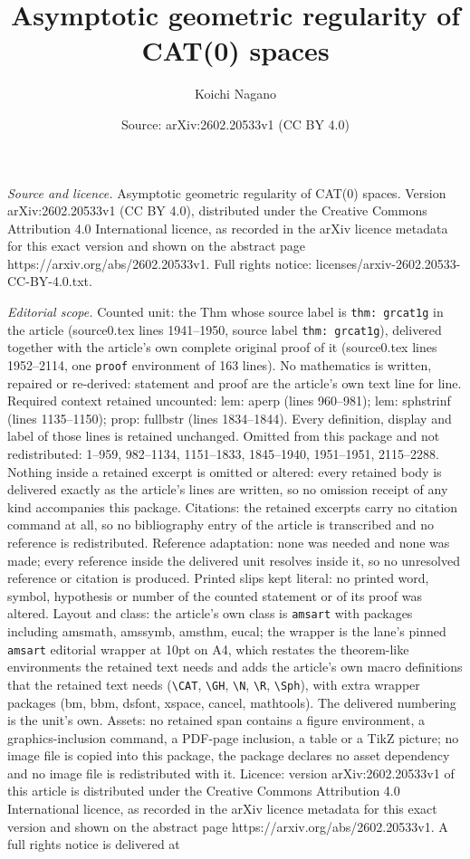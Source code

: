 \documentclass[10pt,a4paper]{amsart}
\title[Asymptotic geometric regularity of CAT(0) spaces]{Asymptotic geometric regularity of CAT(0) spaces}
\author{Koichi Nagano}
\date{Source: arXiv:2602.20533v1 (CC BY 4.0)}
\begin{document}
\maketitle

\noindent\emph{Source and licence.} Asymptotic geometric regularity of CAT(0) spaces. Version arXiv:2602.20533v1 (CC BY 4.0), distributed under the Creative Commons Attribution 4.0 International licence, as recorded in the arXiv licence metadata for this exact version and shown on the abstract page https://arxiv.org/abs/2602.20533v1. Full rights notice: licenses/arxiv-2602.20533-CC-BY-4.0.txt.\par\smallskip

\noindent\textit{Editorial scope.} Counted unit: the Thm whose source label is \texttt{thm: grcat1g} in the article (source0.tex lines 1941--1950, source label \texttt{thm: grcat1g}), delivered together with the article's own complete original proof of it (source0.tex lines 1952--2114, one \texttt{proof} environment of 163 lines). No mathematics is written, repaired or re-derived: statement and proof are the article's own text line for line. Required context retained uncounted: lem: aperp (lines 960--981); lem: sphstrinf (lines 1135--1150); prop: fullbstr (lines 1834--1844). Every definition, display and label of those lines is retained unchanged. Omitted from this package and not redistributed: 1--959, 982--1134, 1151--1833, 1845--1940, 1951--1951, 2115--2288. Nothing inside a retained excerpt is omitted or altered: every retained body is delivered exactly as the article's lines are written, so no omission receipt of any kind accompanies this package. Citations: the retained excerpts carry no citation command at all, so no bibliography entry of the article is transcribed and no reference is redistributed. Reference adaptation: none was needed and none was made; every reference inside the delivered unit resolves inside it, so no unresolved reference or citation is produced. Printed slips kept literal: no printed word, symbol, hypothesis or number of the counted statement or of its proof was altered. Layout and class: the article's own class is \texttt{amsart} with packages including amsmath, amssymb, amsthm, eucal; the wrapper is the lane's pinned \texttt{amsart} editorial wrapper at 10pt on A4, which restates the theorem-like environments the retained text needs and adds the article's own macro definitions that the retained text needs (\texttt{\textbackslash CAT}, \texttt{\textbackslash GH}, \texttt{\textbackslash N}, \texttt{\textbackslash R}, \texttt{\textbackslash Sph}), with extra wrapper packages (bm, bbm, dsfont, xspace, cancel, mathtools). The delivered numbering is the unit's own. Assets: no retained span contains a figure environment, a graphics-inclusion command, a PDF-page inclusion, a table or a TikZ picture; no image file is copied into this package, the package declares no asset dependency and no image file is redistributed with it. Licence: version arXiv:2602.20533v1 of this article is distributed under the Creative Commons Attribution 4.0 International licence, as recorded in the arXiv licence metadata for this exact version and shown on the abstract page https://arxiv.org/abs/2602.20533v1. A full rights notice is delivered at 
\end{document}
